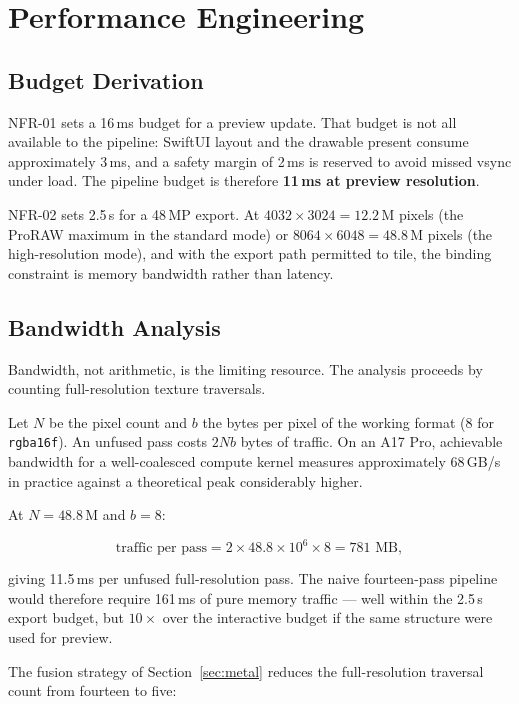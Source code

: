 \section{Performance Engineering}
\label{sec:performance}

\subsection{Budget Derivation}

NFR-01 sets a 16\,ms budget for a preview update. That budget is not all
available to the pipeline: SwiftUI layout and the drawable present consume
approximately 3\,ms, and a safety margin of 2\,ms is reserved to avoid missed
vsync under load. The pipeline budget is therefore \textbf{11\,ms at preview
resolution}.

NFR-02 sets 2.5\,s for a 48\,MP export. At $4032\times3024 = 12.2$\,M pixels
(the ProRAW maximum in the standard mode) or $8064\times6048 = 48.8$\,M pixels
(the high-resolution mode), and with the export path permitted to tile, the
binding constraint is memory bandwidth rather than latency.

\subsection{Bandwidth Analysis}

Bandwidth, not arithmetic, is the limiting resource. The analysis proceeds by
counting full-resolution texture traversals.

Let $N$ be the pixel count and $b$ the bytes per pixel of the working format
(8 for \texttt{rgba16f}). An unfused pass costs $2Nb$ bytes of traffic. On an
A17 Pro, achievable bandwidth for a well-coalesced compute kernel measures
approximately 68\,GB/s in practice against a theoretical peak considerably
higher.

At $N = 48.8$\,M and $b = 8$:

\begin{equation}
\text{traffic per pass} = 2 \times 48.8\times10^6 \times 8 = 781\text{ MB},
\end{equation}

giving 11.5\,ms per unfused full-resolution pass. The naive fourteen-pass
pipeline would therefore require 161\,ms of pure memory traffic --- well within
the 2.5\,s export budget, but $10\times$ over the interactive budget if the
same structure were used for preview.

The fusion strategy of Section~\ref{sec:metal} reduces the full-resolution
traversal count from fourteen to five:

